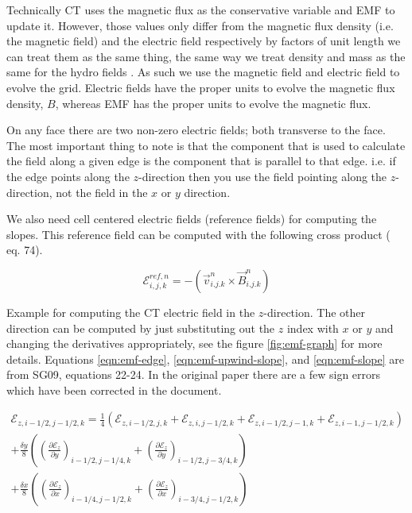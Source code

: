 Technically CT uses the magnetic flux as the conservative variable and EMF to update it. However, those values only differ from the magnetic flux density (i.e. the magnetic field) and the electric field respectively by factors of unit length we can treat them as the same thing, the same way we treat density and mass as the same for the hydro fields \cite{stone_athena_2008}. As such we use the magnetic field and electric field to evolve the grid. Electric fields have the proper units to evolve the magnetic flux density, $ B $, whereas EMF has the proper units to evolve the magnetic flux.

On any face there are two non-zero electric fields; both transverse to the face. The most important thing to note is that the component that is used to calculate the field along a given edge is the component that is parallel to that edge. i.e. if the edge points along the $ z $-direction then you use the field pointing along the $ z $-direction, not the field in the $ x $ or $ y $ direction.

We also need cell centered electric fields (reference fields) for computing the slopes. This reference field can be computed with the following cross product (\cite{gardiner_2005} eq. 74).

\begin{equation}
    \mathcal{E}_{i,j,k}^{ref,n} = - \left( \vec{v}^{n}_{i.j.k} \times \vec{B}^{n}_{i.j.k} \right)
\end{equation}

Example for computing the CT electric field in the $ z $-direction. The other direction can be computed by just substituting out the $ z $ index with $ x $ or $ y $ and changing the derivatives appropriately, see the figure \ref{fig:emf-graph} for more details. Equations \ref{eqn:emf-edge}, \ref{eqn:emf-upwind-slope}, and \ref{eqn:emf-slope} are from SG09, equations 22-24. In the original paper there are a few sign errors which have been corrected in the document.

\begin{equation}
    \label{eqn:emf-edge}
    \begin{aligned}
        \mathcal{E}_{z, i-1/2, j-1/2, k} = \frac{1}{4} \left(
              \mathcal{E}_{z, i-1/2, j, k}
            + \mathcal{E}_{z, i, j-1/2, k}
            + \mathcal{E}_{z, i-1/2, j-1, k}
            + \mathcal{E}_{z, i-1, j-1/2, k}\right) \\
        + \frac{\delta y}{8} \left( \left( \frac{\partial \mathcal{E}_z }{\partial y} \right)_{i-1/2, j-1/4, k} + \left(  \frac{\partial \mathcal{E}_z }{\partial y} \right)_{i-1/2, j-3/4, k} \right) \\
        + \frac{\delta x}{8} \left( \left( \frac{\partial \mathcal{E}_z }{\partial x} \right)_{i-1/4, j-1/2, k} + \left(  \frac{\partial \mathcal{E}_z }{\partial x} \right)_{i-3/4, j-1/2, k} \right)
    \end{aligned}
\end{equation}

